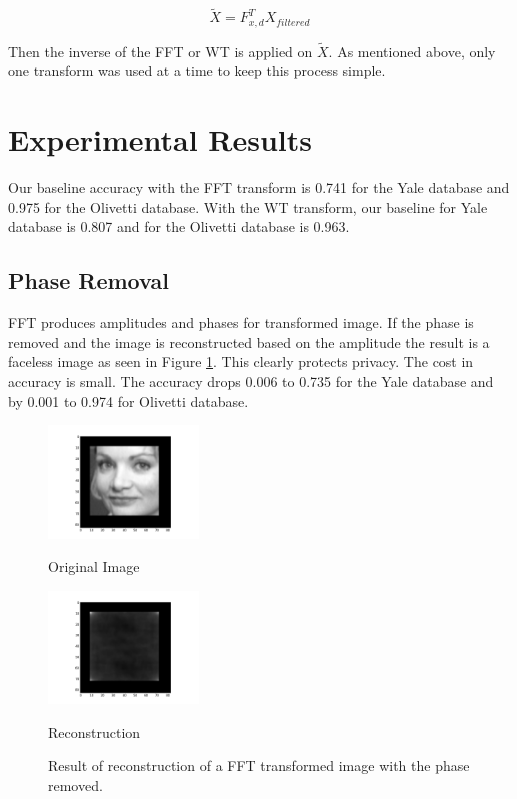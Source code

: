 \documentclass{article}
\begin{document}
\begin{equation}
\tilde{X} =  F_{x,d}^{T}X_{filtered}
\end{equation}

Then the inverse of the FFT or WT is applied on $\tilde{X}$. As mentioned above, only one transform was used at a time to keep this process simple. 


\section{Experimental Results}
\label{sec:ExperimentalResults}

Our baseline accuracy with the FFT transform is 0.741 for the Yale database and 0.975 for the Olivetti database.   
With the WT transform, our baseline for Yale database is 0.807 and for the Olivetti database is 0.963.

\subsection{Phase Removal}

FFT produces amplitudes and phases for transformed image. 
If the phase is removed and the image is reconstructed based on the amplitude the 
result is a faceless image as seen in Figure \ref{fig:nophase}. This clearly protects 
privacy. The cost in accuracy is small. The accuracy drops 0.006 to 0.735 for the Yale database
and by 0.001 to 0.974 for Olivetti database. 

\begin{figure}[!htb]
\begin{minipage}[b]{.48\linewidth}
  \centering
  \centerline{\includegraphics[width=4.0cm]{recon/Original1o}}
  \centerline{Original Image}\medskip
\end{minipage}
\hfill
\begin{minipage}[b]{0.48\linewidth}
  \centering
  \centerline{\includegraphics[width=4.0cm]{recon/Recon1o}}
  \centerline{Reconstruction}\medskip
\end{minipage}
%
\caption{Result of reconstruction of a FFT transformed image with the phase removed.}
\label{fig:nophase}
%
\end{figure}
\end{document}
